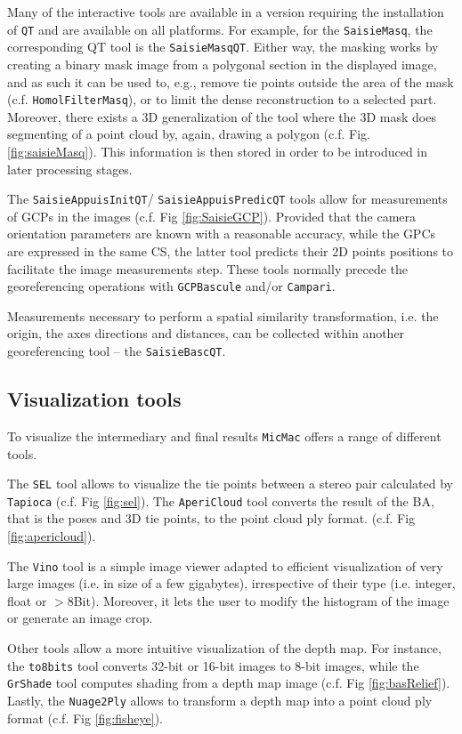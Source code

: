 Many of the interactive tools are available in a version requiring the installation of {\tt QT} and are available on all platforms. For example, for the {\tt SaisieMasq}, the corresponding QT tool is the {\tt SaisieMasqQT}. Either way, the masking works by creating a binary mask image from a polygonal section in the displayed image, and as such it can be used to, e.g., remove tie points outside the area of the mask (c.f. {\tt HomolFilterMasq}), or to limit the dense reconstruction to a selected part. Moreover, there exists a 3D generalization of the tool where the 3D mask does segmenting of a point cloud by, again, drawing a polygon (c.f. Fig. \ref{fig:saisieMasq}).  This information is then stored in order to be introduced in later processing stages.\par 
% 
The {\tt SaisieAppuisInitQT}/ {\tt Saisie\-AppuisPredicQT} tools allow for measurements of GCPs in the images (c.f. Fig \ref{fig:SaisieGCP}). Provided that the camera orientation parameters are known with a reasonable accuracy, while the GPCs are expressed in the same CS, the latter tool predicts their 2D points positions to facilitate the image measurements step. These tools normally precede the georeferencing operations with {\tt GCPBascule} and/or {\tt Campari}.\par 
%
Measurements necessary to perform a spatial similarity transformation, i.e. the origin, the axes directions and distances, can be collected within another georeferencing tool -- the {\tt SaisieBascQT}.  

\subsection*{Visualization tools}
To visualize the intermediary and final results {\tt MicMac} offers a range of different tools.\par 
%
The {\tt SEL} tool allows to visualize the tie points between a stereo pair calculated by {\tt Tapioca} (c.f. Fig \ref{fig:sel}). The {\tt AperiCloud} tool converts the result of the BA, that is the poses and 3D tie points, to the point cloud ply format.  (c.f. Fig \ref{fig:apericloud}). 

The {\tt Vino} tool is a simple image viewer adapted to efficient visualization of very large images (i.e. in size of a few gigabytes), irrespective of their type (i.e. integer, float or $>$8Bit). Moreover, it lets the user to modify the histogram of the image or generate an image crop.

Other tools allow a more intuitive visualization of the depth map. For instance, the {\tt to8bits} tool converts 32-bit or 16-bit images to 8-bit images, while the {\tt GrShade} tool computes shading from a depth map image (c.f. Fig \ref{fig:basRelief}). Lastly, the {\tt Nuage2Ply} allows to transform a depth map into a point cloud ply format (c.f. Fig \ref{fig:fisheye}).



